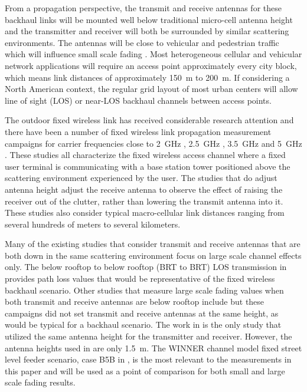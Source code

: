\documentclass[12pt]{IEEEtran}
\begin{document}
From a propagation perspective, the transmit and receive antennas for these backhaul links will be mounted well below traditional micro-cell antenna height and the transmitter and receiver will both be surrounded by similar scattering environments.  The antennas will be close to vehicular and pedestrian traffic which will influence small scale fading \cite{ahumada-l-2006}.  Most heterogeneous cellular and vehicular network applications will require an access point approximately every city block, which means link distances of approximately 150~m to 200~m.  If considering a North American context, the regular grid layout of most urban centers will allow line of sight (LOS) or near-LOS backhaul channels between access points.  

The outdoor fixed wireless link has received considerable research attention and there have been a number of fixed wireless link propagation measurement campaigns for carrier frequencies close to 2~GHz \cite{greenstein-lj-2009, liou-a-2009, michelson-dg-2009}, 2.5~GHz \cite{erceg-v-2004, gans-mj-2002},  3.5~GHz \cite{ahumada-l-2005, hong-cl-2003a, hong-cl-2003b} and 5~GHz \cite{durgin-gd-1998, domazetovic-a-2003, skentos-nd-2006}. These studies all characterize the fixed wireless access channel where a fixed user terminal is communicating with a base station tower positioned above the scattering environment experienced by the user.  The studies that do adjust antenna height \cite{greenstein-lj-2009, durgin-gd-1998, ahumada-l-2005, gans-mj-2002} adjust the receive antenna to observe the effect of raising the receiver out of the clutter, rather than lowering the transmit antenna into it.  These studies also consider typical macro-cellular link distances ranging from several hundreds of meters to several kilometers.

Many of the existing studies that consider transmit and receive antennas that are both down in the same scattering environment focus on large scale channel effects only.  The below rooftop to below rooftop (BRT to BRT) LOS transmission in \cite{802.16-channel-2007} provides path loss values that would be representative of the fixed wireless backhaul scenario.  Other studies that measure large scale fading values when both transmit and receive antennas are below rooftop include \cite{ahumada-l-2013, xia-h-1994, xia-h-1993, feuerstein-mj-1994} but these campaigns did not set transmit and receive antennas at the same height, as would be typical for a backhaul scenario.  The work in \cite{durgin-gd-2003} is the only study that utilized the same antenna height for the transmitter and receiver.  However, the antenna heights used in \cite{durgin-gd-2003} are only 1.5~m.  The WINNER channel model fixed street level feeder scenario, case B5B in \cite{winner-2005}, is the most relevant to the measurements in this paper and will be used as a point of comparison for both small and large scale fading results.
\end{document}
